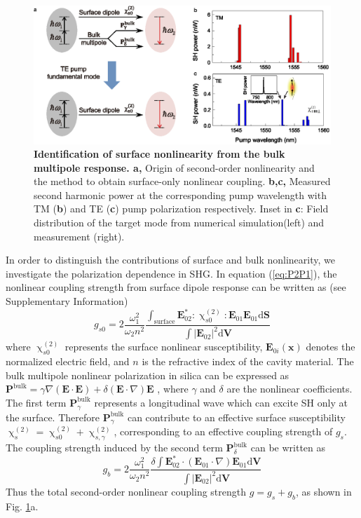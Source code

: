 \documentclass[a4paper,8pt,hyperref, twocolumn]{article}
\begin{document}
\begin{figure}[!ht]
\centering
\includegraphics[width=16cm]{Fig3new.eps}
\caption{\textbf{Identification of surface nonlinearity from the bulk multipole response. a, }Origin of second-order nonlinearity and the method to obtain surface-only nonlinear coupling. \textbf{b,c,} Measured second harmonic power at the corresponding pump wavelength with TM (\textbf{b}) and TE (\textbf{c}) pump polarization respectively. Inset in \textbf{c}: Field distribution of the target mode from numerical simulation(left) and measurement (right).}
\label{pic:Fig3}
\end{figure}


In order to distinguish the contributions of surface and bulk nonlinearity, we investigate the polarization dependence in SHG.  
In equation (\ref{eq:P2P1}), the nonlinear coupling strength from surface dipole response can be written as (see Supplementary Information)
\begin{equation}
g_{s0} = 2\frac{\omega_1^2}{\omega_2n^2}\frac{\int_{\mathrm{surface} } \mathbf{E}_{02}^*:\upchi^{(2)}_{s0}:\mathbf{E}_{01}\mathbf{E}_{01} \mathrm{d}	\mathbf{S}}{\int |\mathbf{E}_{02}|^2 \mathrm{d}	\mathbf{V}}
\end{equation}
where $\upchi^{(2)}_{s0}$ represents the surface nonlinear susceptibility, $\mathbf{E}_{0i}(\mathbf{x})$ denotes the  normalized electric field, and $n$ is the refractive index of the cavity material. 
The bulk multipole nonlinear polarization in silica can be expressed as $\mathbf{P}^{\mathrm{bulk}} =  \gamma\nabla(\mathbf{E}\cdot\mathbf{E})+\delta(\mathbf{E}\cdot\nabla)\mathbf{E}$ \cite{bloembergen1968optical}, where $\gamma$ and $\delta$ are the nonlinear coefficients. The first term $\mathbf{P}^{\mathrm{bulk}}_\gamma$ represents a longitudinal wave which can excite SH only at the surface. Therefore $\mathbf{P}^{\mathrm{bulk}}_\gamma$ can contribute to an effective surface susceptibility\cite{heinz1991second} $\upchi^{(2)}_s = \upchi^{(2)}_{s0}+\upchi^{(2)}_{s,\gamma}$, corresponding to an effective coupling strength of $g_s$. The coupling strength induced by the second term $\mathbf{P}^{\mathrm{bulk}}_\delta$ can be written as 
\begin{equation}
g_b =  2\frac{\omega_1^2}{\omega_2n^2}\frac{\delta \int \mathbf{E}_{02}^* \cdot (\mathbf{E}_{01}\cdot\nabla)\mathbf{E}_{01} \mathrm{d}	\mathbf{V}}{\int |\mathbf{E}_{02}|^2 \mathrm{d} \mathbf{V}}
\label{eq:gb}
\end{equation}
Thus the total second-order nonlinear coupling strength $g = g_s+g_b$, as shown in Fig. \ref{pic:Fig3}a.
\end{document}
